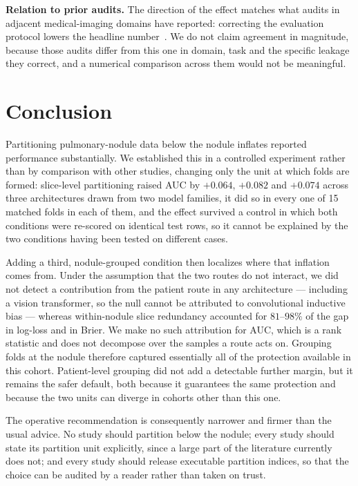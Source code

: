 \documentclass{ieeeaccess}
\newcommand{\vcite}[1]{\cite{#1}}
\begin{document}
\textbf{Relation to prior audits.} The direction of the effect matches what audits in adjacent
medical-imaging domains have reported: correcting the evaluation protocol lowers the headline number~\vcite{wen2020,roberts2021}. We do not claim agreement in magnitude, because those audits differ from
this one in domain, task and the specific leakage they correct, and a numerical comparison across
them would not be meaningful.

\section{Conclusion}
Partitioning pulmonary-nodule data below the nodule inflates reported performance substantially. We
established this in a controlled experiment rather than by comparison with other studies, changing
only the unit at which folds are formed: slice-level partitioning raised AUC by $+0.064$, $+0.082$
and $+0.074$ across three architectures drawn from two model families, it did so in every one of 15
matched folds in each of them, and the
effect survived a control in which both conditions were re-scored on identical test rows, so it
cannot be explained by the two conditions having been tested on different cases.

Adding a third, nodule-grouped condition then localizes where that inflation comes from. Under the
assumption that the two routes do not interact, we did not detect a contribution from the patient
route in any architecture --- including a vision transformer, so the null cannot be attributed to
convolutional inductive bias --- whereas within-nodule slice redundancy accounted for $81$--$98\%$ of
the gap in log-loss and in Brier. We make no such attribution for AUC, which is a rank statistic and
does not decompose over the samples a route acts on. Grouping folds at
the nodule therefore captured essentially all of the protection available in this cohort. Patient-level
grouping did not add a detectable further margin, but it remains the safer default, both because it
guarantees the same protection and because the two units can diverge in cohorts other than this one.

The operative recommendation is consequently narrower and firmer than the usual advice. No study
should partition below the nodule; every study should state its partition unit explicitly, since a
large part of the literature currently does not; and every study should release executable partition
indices, so that the choice can be audited by a reader rather than taken on trust.
\end{document}
